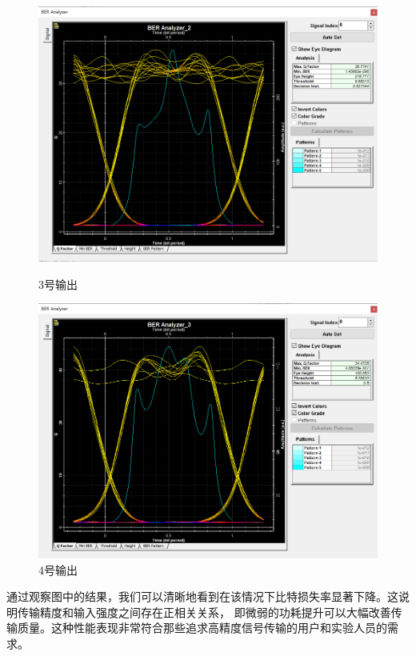 \documentclass[12pt]{article}
\begin{document}
\begin{figure}[H]
\begin{minipage}[t]{0.5\linewidth}
        \includegraphics[scale=0.5]{sweep2Q3.png}
        \caption{3号输出}
        \label{fig:side:a}
      \end{minipage}%
      \begin{minipage}[t]{0.5\linewidth}
        \centering
        \includegraphics[scale=0.5]{sweep2Q4.png}
        \caption{4号输出}
        \label{fig:side:b}
      \end{minipage}
\end{figure}
通过观察图中的结果，我们可以清晰地看到在该情况下比特损失率显著下降。这说明传输精度和输入强度之间存在正相关关系，
即微弱的功耗提升可以大幅改善传输质量。这种性能表现非常符合那些追求高精度信号传输的用户和实验人员的需求。
\end{document}
